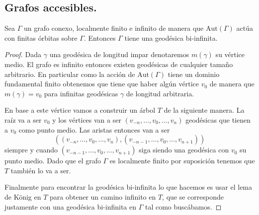 \documentclass[tesis.tex]{subfiles}
\newcommand{\aut}{\text{Aut}}
\begin{document}
\subsection{Grafos accesibles.}

\begin{lema}\label{lema_geodesica_biinfinita}
	Sea $\Gamma$ un grafo conexo, localmente finito e infinito de manera que $\aut(\Gamma)$ actúa con finitas órbitas sobre $\Gamma$.
	Entonces $\Gamma$ tiene una geodésica bi-infinita.
\end{lema}
\begin{proof}
	Dada $\gamma$ una geodésica de longitud impar denotaremos $m(\gamma)$ su vértice medio.	
	El grafo es infinito entonces existen geodésicas de cualquier tamaño arbitrario.
	En particular como la acción de $\aut(\Gamma)$ tiene un dominio fundamental finito obtenemos que tiene que haber algún vértice $v_0$ de manera que $m(\gamma) = v_0$ para infinitas geodésicas $\gamma$ de longitud arbitraria.
	
	En base a este vértice vamos a construir un árbol $T$ de la siguiente manera.
	La raíz va a ser $v_0$ y los vértices van a ser $(v_{-n},\dots, v_0,\dots,v_n)$ geodésicas que tienen a $v_0$ como punto medio.
	Las aristas entonces van a ser 
	\[
		((v_{-n},\dots, v_0,\dots,v_n), (v_{-n-1},\dots, v_0,\dots,v_{n+1}))
	\]
	siempre y cuando $(v_{-n-1},\dots, v_0,\dots,v_{n+1})$ siga siendo una geodésica con $v_0$ su punto medio.
	Dado que el grafo $\Gamma$ es localmente finito por suposición tenemos que $T$ también lo va a ser.
	
	Finalmente para encontrar la geodésica bi-infinita lo que hacemos es usar el lema de König en $T$ para obtener un camino infinito en $T$, que se corresponde justamente con una geodésica bi-infinita en $\Gamma$ tal como buscábamos.
	
\end{proof}
\end{document}

